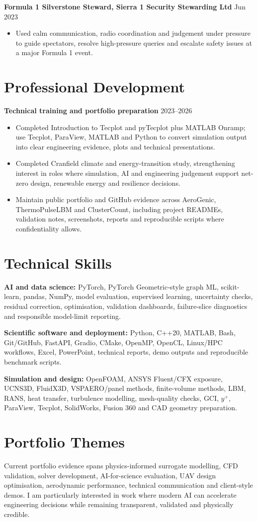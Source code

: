 \documentclass[10pt,a4paper]{article}
\begin{document}
\textbf{Formula 1 Silverstone Steward, Sierra 1 Security Stewarding Ltd} \hfill Jun 2023
\begin{itemize}
  \item Used calm communication, radio coordination and judgement under pressure to guide spectators, resolve high-pressure queries and escalate safety issues at a major Formula 1 event.
\end{itemize}

\section{Professional Development}
\textbf{Technical training and portfolio preparation} \hfill 2023--2026
\begin{itemize}
  \item Completed Introduction to Tecplot and pyTecplot plus MATLAB Onramp; use Tecplot, ParaView, MATLAB and Python to convert simulation output into clear engineering evidence, plots and technical presentations.
  \item Completed Cranfield climate and energy-transition study, strengthening interest in roles where simulation, AI and engineering judgement support net-zero design, renewable energy and resilience decisions.
  \item Maintain public portfolio and GitHub evidence across AeroGenic, ThermoPulseLBM and ClusterCount, including project READMEs, validation notes, screenshots, reports and reproducible scripts where confidentiality allows.
\end{itemize}
\section{Technical Skills}
\textbf{AI and data science:} PyTorch, PyTorch Geometric-style graph ML, scikit-learn, pandas, NumPy, model evaluation, supervised learning, uncertainty checks, residual correction, optimisation, validation dashboards, failure-slice diagnostics and responsible model-limit reporting.\par
\textbf{Scientific software and deployment:} Python, C++20, MATLAB, Bash, Git/GitHub, FastAPI, Gradio, CMake, OpenMP, OpenCL, Linux/HPC workflows, Excel, PowerPoint, technical reports, demo outputs and reproducible benchmark scripts.\par
\textbf{Simulation and design:} OpenFOAM, ANSYS Fluent/CFX exposure, UCNS3D, FluidX3D, VSPAERO/panel methods, finite-volume methods, LBM, RANS, heat transfer, turbulence modelling, mesh-quality checks, GCI, $y^+$, ParaView, Tecplot, SolidWorks, Fusion 360 and CAD geometry preparation.

\section{Portfolio Themes}
Current portfolio evidence spans physics-informed surrogate modelling, CFD validation, solver development, AI-for-science evaluation, UAV design optimisation, aerodynamic performance, technical communication and client-style demos. I am particularly interested in work where modern AI can accelerate engineering decisions while remaining transparent, validated and physically credible.
\end{document}
